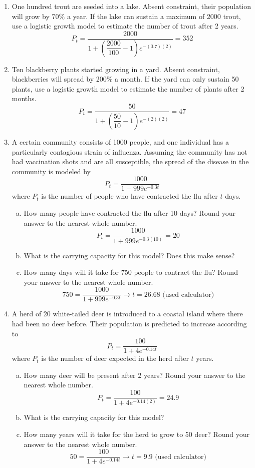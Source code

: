 \begin{enumerate}
\item One hundred trout are seeded into a lake.  Absent constraint, their population will grow by 70\% a year.  If the lake can sustain a maximum of 2000 trout, use a logistic growth model to estimate the number of trout after 2 years. 
\[P_t = \dfrac{2000}{1 + \left(\dfrac{2000}{100} - 1\right)e^{-(0.7)(2)}} = 352\]

\item Ten blackberry plants started growing in a yard.  Absent constraint, blackberries will spread by 200\% a month.  If the yard can only sustain 50 plants, use a logistic growth model to estimate the number of plants after 2 months. 
\[P_t = \dfrac{50}{1 + \left(\dfrac{50}{10} - 1\right)e^{-(2)(2)}} = 47\]

\item A certain community consists of 1000 people, and one individual has a particularly contagious strain of influenza.  Assuming the community has not had vaccination shots and are all susceptible, the spread of the disease in the community is modeled by \[P_t = \dfrac{1000}{1+999e^{-0.3t}}\] where $P_t$ is the number of people who have contracted the flu after $t$ days.
\begin{enumerate}[(a)]
\item How many people have contracted the flu after 10 days?  Round your answer to the nearest whole number. 
\[P_t = \dfrac{1000}{1+999e^{-0.3(10)}} = 20\]
\item What is the carrying capacity for this model?  Does this make sense? 
\item How many days will it take for 750 people to contract the flu?  Round your answer to the nearest whole number. 
\[750 = \dfrac{1000}{1+999e^{-0.3t}} \longrightarrow t = 26.68 \textrm{ (used calculator)}\]
\end{enumerate}

\item A herd of 20 white-tailed deer is introduced to a coastal island where there had been no deer before.  Their population is predicted to increase according to \[P_t = \dfrac{100}{1+4e^{-0.14t}}\] where $P_t$ is the number of deer expected in the herd after $t$ years.
\begin{enumerate}[(a)]
\item How many deer will be present after 2 years?  Round your answer to the nearest whole number. 
\[P_t = \dfrac{100}{1+4e^{-0.14(2)}} = 24.9\]
\item What is the carrying capacity for this model? 
\item How many years will it take for the herd to grow to 50 deer?  Round your answer to the nearest whole number. 
\[50 = \dfrac{100}{1+4e^{-0.14t}} \longrightarrow t = 9.9 \textrm{ (used calculator)}\]
\end{enumerate}


\end{enumerate}
